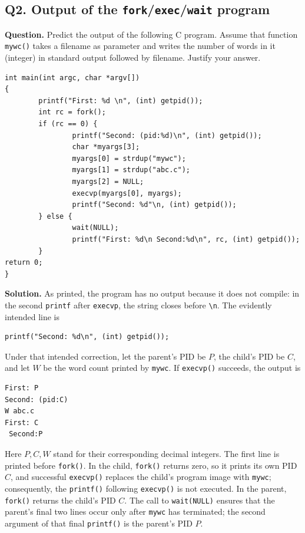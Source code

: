 \subsection*{Q2. Output of the \texttt{fork}/\texttt{exec}/\texttt{wait} program}

\textbf{Question.}
Predict the output of the following C program. Assume that function
\texttt{mywc()} takes a filename as parameter and writes the number of words
in it (integer) in standard output followed by filename. Justify your answer.

\begin{verbatim}
int main(int argc, char *argv[])
{
        printf("First: %d \n", (int) getpid());
        int rc = fork();
        if (rc == 0) {
                printf("Second: (pid:%d)\n", (int) getpid());
                char *myargs[3];
                myargs[0] = strdup("mywc");
                myargs[1] = strdup("abc.c");
                myargs[2] = NULL;
                execvp(myargs[0], myargs);
                printf("Second: %d"\n, (int) getpid());
        } else {
                wait(NULL);
                printf("First: %d\n Second:%d\n", rc, (int) getpid());
        }
return 0;
}
\end{verbatim}

\textbf{Solution.}
As printed, the program has no output because it does not compile: in the
second \texttt{printf} after \texttt{execvp}, the string closes before
\verb|\n|. The evidently intended line is
\begin{verbatim}
printf("Second: %d\n", (int) getpid());
\end{verbatim}
Under that intended correction, let the parent's PID be \(P\), the child's
PID be \(C\), and let \(W\) be the word count printed by \texttt{mywc}. If
\texttt{execvp()} succeeds, the output is
\begin{verbatim}
First: P
Second: (pid:C)
W abc.c
First: C
 Second:P
\end{verbatim}
Here \(P,C,W\) stand for their corresponding decimal integers. The first line
is printed before \texttt{fork()}. In the child, \texttt{fork()} returns zero,
so it prints its own PID \(C\), and successful \texttt{execvp()} replaces the
child's program image with \texttt{mywc}; consequently, the \texttt{printf()}
following \texttt{execvp()} is not executed. In the parent, \texttt{fork()}
returns the child's PID \(C\). The call to \texttt{wait(NULL)} ensures that the
parent's final two lines occur only after \texttt{mywc} has terminated; the
second argument of that final \texttt{printf()} is the parent's PID \(P\).

